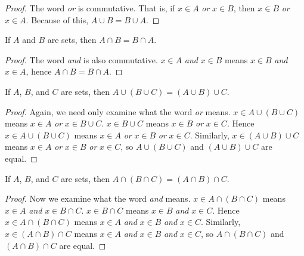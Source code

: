             \begin{proof}
                The word \textit{or} is commutative. That is, if
                $x\in{A}$ \textit{or} $x\in{B}$, then $x\in{B}$ \textit{or}
                $x\in{A}$. Because of this, $A\cup{B}=B\cup{A}$.
            \end{proof}
            \begin{theorem}
                If $A$ and $B$ are sets, then $A\cap{B}=B\cap{A}$.
            \end{theorem}
            \begin{proof}
                The word \textit{and} is also commutative. $x\in{A}$
                \textit{and} $x\in{B}$ means $x\in{B}$ \textit{and}
                $x\in{A}$, hence $A\cap{B}=B\cap{A}$.
            \end{proof}
            \begin{theorem}
                If $A$, $B$, and $C$ are sets, then
                $A\cup(B\cup{C})=(A\cup{B})\cup{C}$.
            \end{theorem}
            \begin{proof}
                Again, we need only examine what the word \textit{or} means.
                $x\in{A}\cup(B\cup{C})$ means $x\in{A}$ \textit{or}
                $x\in{B}\cup{C}$. $x\in{B}\cup{C}$ means $x\in{B}$ \textit{or}
                $x\in{C}$. Hence $x\in{A}\cup(B\cup{C})$ means
                $x\in{A}$ \textit{or} $x\in{B}$ \textit{or} $x\in{C}$.
                Similarly, $x\in(A\cup{B})\cup{C}$ means
                $x\in{A}$ \textit{or} $x\in{B}$ \textit{or} $x\in{C}$, so
                $A\cup(B\cup{C})$ and $(A\cup{B})\cup{C}$ are equal.
            \end{proof}
            \begin{theorem}
                If $A$, $B$, and $C$ are sets, then
                $A\cap(B\cap{C})=(A\cap{B})\cap{C}$.
            \end{theorem}
            \begin{proof}
                Now we examine what the word \textit{and} means.
                $x\in{A}\cap(B\cap{C})$ means $x\in{A}$ \textit{and}
                $x\in{B}\cap{C}$. $x\in{B}\cap{C}$ means $x\in{B}$ \textit{and}
                $x\in{C}$. Hence $x\in{A}\cap(B\cap{C})$ means
                $x\in{A}$ \textit{and} $x\in{B}$ \textit{and} $x\in{C}$.
                Similarly, $x\in(A\cap{B})\cap{C}$ means
                $x\in{A}$ \textit{and} $x\in{B}$ \textit{and} $x\in{C}$, so
                $A\cap(B\cap{C})$ and $(A\cap{B})\cap{C}$ are equal.
            \end{proof}
